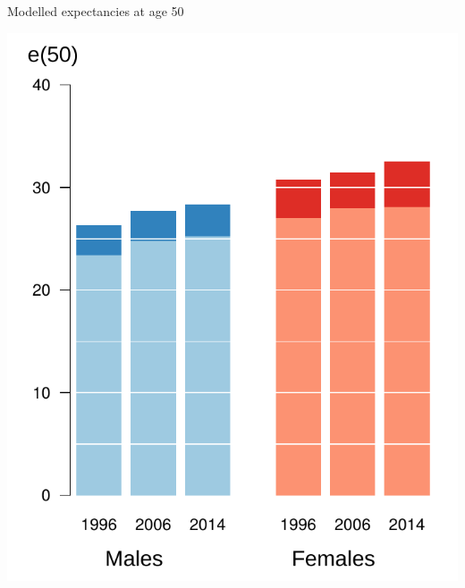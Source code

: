 \documentclass[20pt,usenames,dvipsnames]{beamer}
\begin{document}
\begin{frame}[plain]
\Large 
\begin{center}
Modelled expectancies at age 50 \vspace{1em}

\includegraphics{BarsInk.pdf}
\end{center}
\end{frame}
\end{document}
